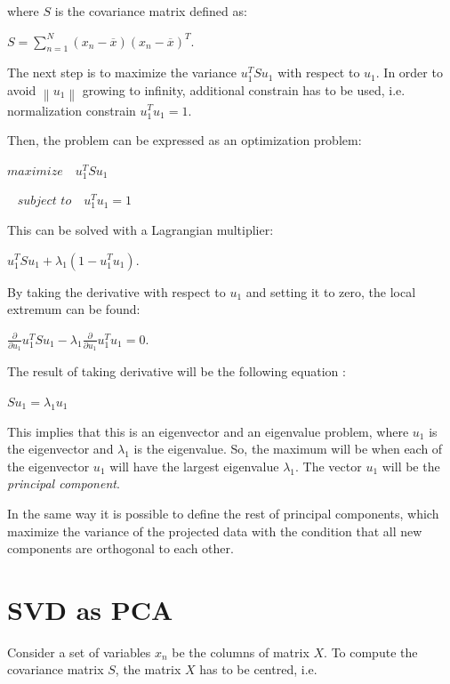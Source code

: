 where $S$ is the covariance matrix defined as:

{\centering$S=\sum_{n=1}^{N}(x_{n}-\overline{x})(x_{n}-\overline{x})^T.$\\}

The next step is to maximize the variance $u_{1}^TSu_{1}$ with respect to $u_{1}$. In order to avoid $\left \| u_{1} \right \|$ growing to infinity, additional constrain has to be used,
i.e.  normalization constrain $u_{1}^Tu_{1}=1$.

Then, the problem can be expressed as an optimization problem:

{\centering$maximize\,\,\,\,\,\,u_{1}^TSu_{1}$\\}

{\centering$\,\,\,\,\,subject \,\,to \,\,\,\,\,\,u_{1}^Tu_{1}=1$\\}

This can be solved with a Lagrangian multiplier:

{\centering$u_{1}^TSu_{1}+\lambda_{1}(1-u_{1}^Tu_{1}).$\\}

By taking the derivative with respect to $u_{1}$ and setting it to zero, the local extremum can be found:

{\centering$\frac{\partial }{\partial u_{1}}u_{1}^TSu_{1}-\lambda_{1}\frac{\partial }{\partial u_{1}}u_{1}^Tu_{1}=0.$\\}

The result of taking derivative will be the following equation \cite{Bishop}:

{\centering$Su_{1}=\lambda_{1}u_{1}$\\}

This implies that this is an eigenvector and an eigenvalue problem, where $u_{1}$ is the eigenvector and $\lambda_{1}$ is the eigenvalue.
So, the maximum will be when each of the eigenvector $u_{1}$ will have the largest eigenvalue $\lambda_{1}$. 
The vector $u_{1}$ will be the \emph{principal component}.

In the same way it is possible to define the rest of principal components, 
which maximize the variance of the projected data with the condition that all new components are orthogonal to each other.


 \section{SVD as PCA}
\label{section:svd}
Consider a set of variables $x_{n}$ be the columns of matrix $X$. To compute the covariance matrix $S$, the matrix $X$ has to be centred, i.e. 

